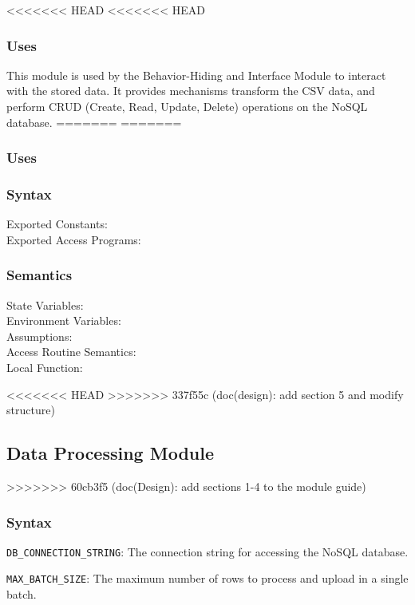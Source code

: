 \documentclass[12pt, titlepage]{article}
\begin{document}
\begin{description}
<<<<<<< HEAD
<<<<<<< HEAD
\subsubsection{Uses}
This module is used by the Behavior-Hiding and Interface Module to interact
with the stored data. It provides mechanisms transform the CSV data, and
perform CRUD (Create, Read, Update, Delete) operations on the NoSQL database.
=======
=======
\subsubsection{Uses}

\subsubsection{Syntax}
\begin{description}
  \item[Exported Constants:] 
  \item[Exported Access Programs:] 
\end{description}

\subsubsection{Semantics}
\begin{description}
  \item[State Variables:]
  \item[Environment Variables:]  
  \item[Assumptions:] 
  \item[Access Routine Semantics:] 
  \item[Local Function:] 
\end{description}

<<<<<<< HEAD
>>>>>>> 337f55c (doc(design): add section 5 and modify structure)
\subsection{Data Processing Module}
>>>>>>> 60cb3f5 (doc(Design): add sections 1-4 to the module guide)

\subsubsection{Syntax}
\begin{description}
  \item[Exported Constants and Access Programs:]
  \item 
  \texttt{DB\_CONNECTION\_STRING}: The connection string for accessing the
    NoSQL database.
  \item
  \texttt{MAX\_BATCH\_SIZE}: The maximum number of rows to process and upload
  in a single batch.


\end{description}
\end{description}
\end{document}
